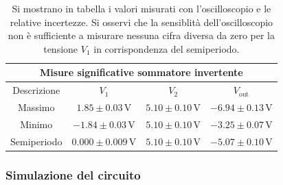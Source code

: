 \documentclass[a4paper,11pt]{article}
\newcommand\V{ \,\si{\volt} }
\begin{document}
\begin{table}[h]
\centering
\setlength{\tabcolsep}{10pt}
\begin{tabular}{ |c|c|c|c|  }
  \hline
  \multicolumn{4}{|c|}{Misure significative sommatore invertente} \\
  \hline
  Descrizione & $V_{1}$  & $V_{2}$ & $V_{\text{out}}$\\
  \hline
  Massimo & $1.85 \pm 0.03 \V$ & $5.10 \pm 0.10 \V$ & $-6.94 \pm 0.13 \V$ \\
  Minimo & $-1.84 \pm 0.03 \V$ & $5.10 \pm 0.10 \V$ & $-3.25 \pm 0.07 \V$ \\
  Semiperiodo & $ 0.000 \pm 0.009 \V$ & $5.10 \pm 0.10 \V$ & $-5.07 \pm 0.10 \V$ \\
  \hline
\end{tabular}
\caption{\footnotesize Si mostrano in tabella i valori misurati con l'oscilloscopio e
  le relative incertezze. Si osservi che la sensiblità dell'oscilloscopio non è
  sufficiente a misurare nessuna cifra diversa da zero per la tensione $V_{1}$
  in corrispondenza del semiperiodo.
}\label{tab:mis_sum}
\end{table}

\subsubsection{Simulazione del circuito}
\label{sec:simul-del-circ}
\end{document}
